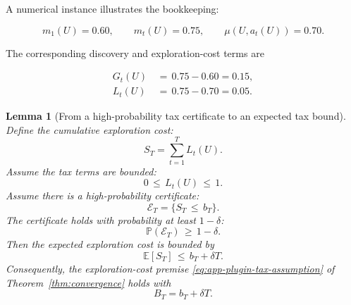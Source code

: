 \documentclass{article} %
\newtheorem{lemma}[theorem]{Lemma}
\begin{document}
A numerical instance illustrates the bookkeeping:

\begin{equation}
\label{eq:app-fifth-numeric-bookkeeping}
m_1(U)=0.60,
\qquad
m_t(U)=0.75,
\qquad
\mu(U,a_t(U))=0.70.
\end{equation}

The corresponding discovery and exploration-cost terms are

\begin{align}
\label{eq:app-fifth-numeric-bookkeeping-terms}
G_t(U)
&\,=\,
0.75-0.60
=
0.15,
\\
L_t(U)
&\,=\,
0.75-0.70
=
0.05.
\end{align}

\begin{lemma}[From a high-probability tax certificate to an expected tax bound]
\label{lem:6}
Define the cumulative exploration cost:
\begin{equation}
\label{eq:app-fifth-ST}
S_T
=
\sum_{t=1}^{T}L_t(U).
\end{equation}
Assume the tax terms are bounded:
\begin{equation}
\label{eq:app-fifth-tax-bounded}
0\,\le\, L_t(U)\,\le\, 1.
\end{equation}
Assume there is a high-probability certificate:
\begin{equation}
\label{eq:app-fifth-event-cert}
\mathcal{E}_T
=
\{S_T\,\le\, b_T\}.
\end{equation}
The certificate holds with probability at least \(1-\delta\):
\begin{equation}
\label{eq:app-fifth-event-prob}
\mathbb{P}(\mathcal{E}_T)\,\ge\, 1-\delta.
\end{equation}
Then the expected exploration cost is bounded by
\begin{equation}
\label{eq:app-fifth-expected-tax}
\mathbb{E}[S_T]
\,\le\,
b_T+\delta T.
\end{equation}
Consequently, the exploration-cost premise
\eqref{eq:app-plugin-tax-assumption} of Theorem~\ref{thm:convergence} holds with
\begin{equation}
\label{eq:app-fifth-BT-from-cert}
B_T
=
b_T+\delta T.
\end{equation}
\end{lemma}
\end{document}
